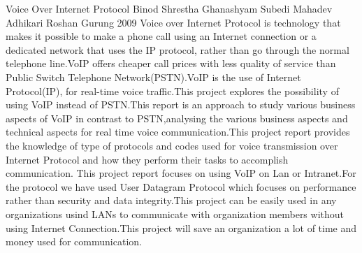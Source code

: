  \begin{conf-abstract}[]
{Voice Over Internet Protocol}
{
Binod Shrestha
Ghanashyam Subedi
Mahadev Adhikari
Roshan Gurung
}
{2009}
Voice over Internet Protocol is technology that makes it possible to make a phone call using an Internet connection or a dedicated network  that uses the IP protocol,
rather than  go through the normal telephone line.VoIP offers cheaper call prices with less quality of service than Public Switch Telephone Network(PSTN).VoIP is 
the use of Internet Protocol(IP), for real-time voice traffic.This project explores the possibility of using VoIP instead of PSTN.This report is an approach to study 
various business aspects of VoIP in contrast to PSTN,analysing the various business aspects and technical aspects for real time voice communication.This project report
 provides the knowledge of type of protocols and codes used for voice transmission over Internet Protocol and how they perform their tasks to accomplish communication.
This project report focuses on using VoIP on Lan or Intranet.For the protocol we have used User Datagram Protocol which focuses on performance rather than security 
and data integrity.This project can be easily used in any organizations usind LANs to communicate with organization members without using Internet Connection.This 
project will save an organization a lot of time and money used for communication.  
  \end{conf-abstract}